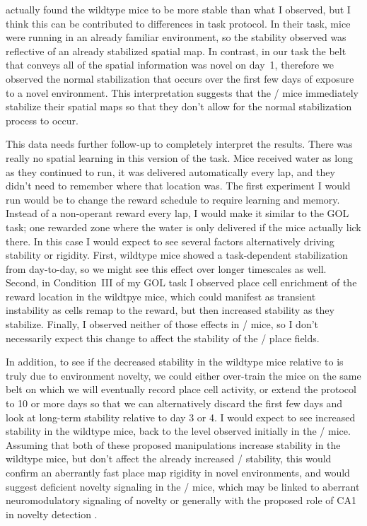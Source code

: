 \citeauthor{Ziv2013} actually found the wildtype mice to be more stable than what I observed, but I think this can be contributed to differences in task protocol.
In their task, mice were running in an already familiar environment, so the stability observed was reflective of an already stabilized spatial map.
In contrast, in our task the belt that conveys all of the spatial information was novel on day~1, therefore we observed the normal stabilization that occurs over the first few days of exposure to a novel environment.
This interpretation suggests that the \df/ mice immediately stabilize their spatial maps so that they don't allow for the normal stabilization process to occur.

This data needs further follow-up to completely interpret the results.
There was really no spatial learning in this version of the task.
Mice received water as long as they continued to run, it was delivered automatically every lap, and they didn't need to remember where that location was.
The first experiment I would run would be to change the reward schedule to require learning and memory.
Instead of a non-operant reward every lap, I would make it similar to the \ac{GOL} task; one rewarded zone where the water is only delivered if the mice actually lick there.
In this case I would expect to see several factors alternatively driving stability or rigidity.
First, wildtype mice showed a task-dependent stabilization from day-to-day, so we might see this effect over longer timescales as well.
Second, in Condition~III of my \ac{GOL} task I observed place cell enrichment of the reward location in the wildtpye mice, which could manifest as transient instability as cells remap to the reward, but then increased stability as they stabilize.
Finally, I observed neither of those effects in \df/ mice, so I don't necessarily expect this change to affect the stability of the \df/ place fields.

In addition, to see if the decreased stability in the wildtype mice relative to \citeauthor{Ziv2013} is truly due to environment novelty, we could either over-train the mice on the same belt on which we will eventually record place cell activity, or extend the protocol to 10 or more days so that we can alternatively discard the first few days and look at long-term stability relative to day 3 or 4.
I would expect to see increased stability in the wildtype mice, back to the level observed initially in the \df/ mice.
Assuming that both of these proposed manipulations increase stability in the wildtype mice, but don't affect the already increased \df/ stability, this would confirm an aberrantly fast place map rigidity in novel environments, and would suggest deficient novelty signaling in the \df/ mice, which may be linked to aberrant neuromodulatory signaling of novelty or generally with the proposed role of CA1 in novelty detection \citep{Li2003d, Barry2012c, Larkin2014, Nitz2004}.

